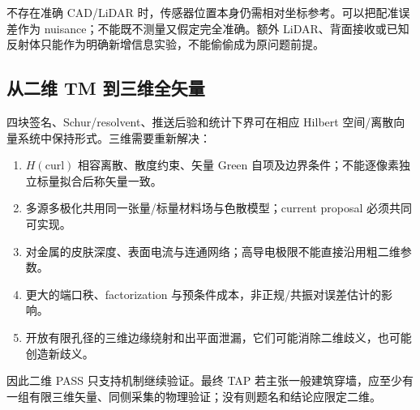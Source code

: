 不存在准确 CAD/LiDAR 时，传感器位置本身仍需相对坐标参考。可以把配准误差作为 nuisance；不能既不测量又假定完全准确。额外 LiDAR、背面接收或已知反射体只能作为明确新增信息实验，不能偷偷成为原问题前提。\cite{L_Lidar}

\subsection{从二维 TM 到三维全矢量}
四块签名、Schur/resolvent、推送后验和统计下界可在相应 Hilbert 空间/离散向量系统中保持形式。三维需要重新解决：
\begin{enumerate}
\item $H(\mathrm{curl})$ 相容离散、散度约束、矢量 Green 自项及边界条件；不能逐像素独立标量拟合后称矢量一致。
\item 多源多极化共用同一张量/标量材料场与色散模型；current proposal 必须共同可实现。
\item 对金属的皮肤深度、表面电流与连通网络；高导电极限不能直接沿用粗二维参数。
\item 更大的端口秩、factorization 与预条件成本，非正规/共振对误差估计的影响。
\item 开放有限孔径的三维边缘绕射和出平面泄漏，它们可能消除二维歧义，也可能创造新歧义。
\end{enumerate}
因此二维 PASS 只支持机制继续验证。最终 TAP 若主张一般建筑穿墙，应至少有一组有限三维矢量、同侧采集的物理验证；没有则题名和结论应限定二维。

